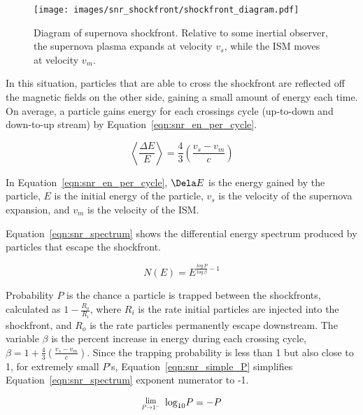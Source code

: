   \begin{figure}[ht]
    \centering
    \texttt{[image: images/snr\_shockfront/shockfront\_diagram.pdf]}
    \caption[Supernova Shockfront]{
      Diagram of supernova shockfront.
      Relative to some inertial observer, the supernova plasma expands at velocity $v_s$, while the ISM moves at velocity $v_m$.
    }
    \label{fig:snr_shockfront}
  \end{figure}
  
  In this situation, particles that are able to cross the shockfront are reflected off the magnetic fields on the other side, gaining a small amount of energy each time.
  On average, a particle gains energy for each crossings cycle (up-to-down and down-to-up stream) by Equation~\ref{eqn:snr_en_per_cycle}.
  
  \begin{equation}\label{eqn:snr_en_per_cycle}
    \left \langle \frac{\Delta E}{E} \right \rangle = \frac{4}{3} \left ( \frac{v_{s}-v_{m}}{c} \right )
  \end{equation}
  
  In Equation~\ref{eqn:snr_en_per_cycle}, $\Dela E$ is the energy gained by the particle, $E$ is the initial energy of the particle, $v_s$ is the velocity of the supernova expansion, and $v_m$ is the velocity of the ISM.

  Equation~\ref{eqn:snr_spectrum} shows the differential energy spectrum produced by particles that escape the shockfront.
  
  \begin{equation}\label{eqn:snr_spectrum}
    N(E)=E^{ \frac{log\:P}{log\: \beta} -1}
  \end{equation}

  Probability $P$ is the chance a particle is trapped between the shockfronts, calculated as $1 - \frac{R_o}{R_i}$, where $R_i$ is the rate initial particles are injected into the shockfront, and $R_o$ is the rate particles permanently escape downstream.
  The variable $\beta$ is the percent increase in energy during each crossing cycle, $\beta = 1+ \frac{4}{3} \left ( \frac{v_s - v_m}{c} \right )$.
  Since the trapping probability is less than 1 but also close to 1, for extremely small $P$'s, Equation~\ref{eqn:snr_simple_P} simplifies Equation~\ref{eqn:snr_spectrum} exponent numerator to -1.
  
  \begin{equation}\label{eqn:snr_simple_P}
    \Lim{P \rightarrow 1^{-}} \; \textrm{log}_{10} P = -P
  \end{equation}
  
